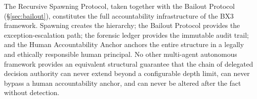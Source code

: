 \bigskip

The Recursive Spawning Protocol, taken together with the Bailout Protocol (\S\ref{sec:bailout}), constitutes the full accountability infrastructure of the BX3 framework. Spawning creates the hierarchy; the Bailout Protocol provides the exception-escalation path; the forensic ledger provides the immutable audit trail; and the Human Accountability Anchor anchors the entire structure in a legally and ethically responsible human principal. No other multi-agent autonomous framework provides an equivalent structural guarantee that the chain of delegated decision authority can never extend beyond a configurable depth limit, can never bypass a human accountability anchor, and can never be altered after the fact without detection.
